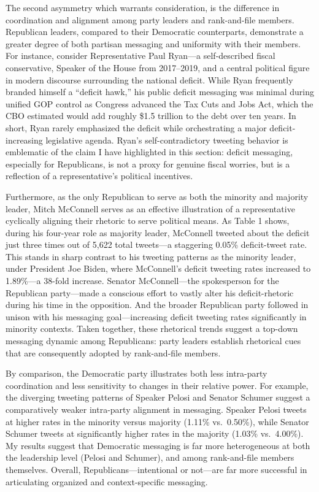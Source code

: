 \documentclass[
  12pt,
]{article}
\begin{document}
The second asymmetry which warrants consideration, is the difference in
coordination and alignment among party leaders and rank-and-file
members. Republican leaders, compared to their Democratic counterparts,
demonstrate a greater degree of both partisan messaging and uniformity
with their members. For instance, consider Representative Paul Ryan---a
self-described fiscal conservative, Speaker of the House from
2017--2019, and a central political figure in modern discourse
surrounding the national deficit. While Ryan frequently branded himself
a ``deficit hawk,'' his public deficit messaging was minimal during
unified GOP control as Congress advanced the Tax Cuts and Jobs Act,
which the CBO estimated would add roughly \$1.5 trillion to the debt
over ten years. In short, Ryan rarely emphasized the deficit while
orchestrating a major deficit-increasing legislative agenda. Ryan's
self-contradictory tweeting behavior is emblematic of the claim I have
highlighted in this section: deficit messaging, especially for
Republicans, is not a proxy for genuine fiscal worries, but is a
reflection of a representative's political incentives.

Furthermore, as the only Republican to serve as both the minority and
majority leader, Mitch McConnell serves as an effective illustration of
a representative cyclically aligning their rhetoric to serve political
means. As Table 1 shows, during his four-year role as majority leader,
McConnell tweeted about the deficit just three times out of 5,622 total
tweets---a staggering 0.05\% deficit-tweet rate. This stands in sharp
contrast to his tweeting patterns as the minority leader, under
President Joe Biden, where McConnell's deficit tweeting rates increased
to 1.89\%---a 38-fold increase. Senator McConnell---the spokesperson for
the Republican party---made a conscious effort to vastly alter his
deficit-rhetoric during his time in the opposition. And the broader
Republican party followed in unison with his messaging goal---increasing
deficit tweeting rates significantly in minority contexts. Taken
together, these rhetorical trends suggest a top-down messaging dynamic
among Republicans: party leaders establish rhetorical cues that are
consequently adopted by rank-and-file members.

By comparison, the Democratic party illustrates both less intra-party
coordination and less sensitivity to changes in their relative power.
For example, the diverging tweeting patterns of Speaker Pelosi and
Senator Schumer suggest a comparatively weaker intra-party alignment in
messaging. Speaker Pelosi tweets at higher rates in the minority versus
majority (1.11\% vs.~0.50\%), while Senator Schumer tweets at
significantly higher rates in the majority (1.03\% vs.~4.00\%). My
results suggest that Democratic messaging is far more heterogeneous at
both the leadership level (Pelosi and Schumer), and among rank-and-file
members themselves. Overall, Republicans---intentional or not---are far
more successful in articulating organized and context-specific
messaging.
\end{document}
